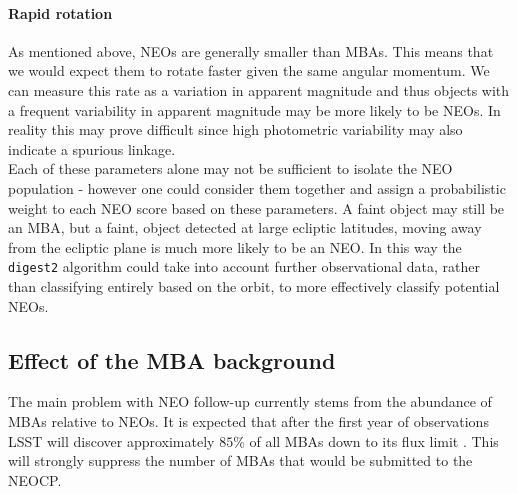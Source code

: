 \documentclass[twocolumn]{aastex631}
\newcommand{\dig}{\texttt{digest2}}
\begin{document}
\paragraph{Rapid rotation} As mentioned above, NEOs are generally smaller than MBAs. This means that we would expect them to rotate faster given the same angular momentum. We can measure this rate as a variation in apparent magnitude and thus objects with a frequent variability in apparent magnitude may be more likely to be NEOs. In reality this may prove difficult since high photometric variability may also indicate a spurious linkage.\\

Each of these parameters alone may not be sufficient to isolate the NEO population - however one could consider them together and assign a probabilistic weight to each NEO score based on these parameters. A faint object may still be an MBA, but a faint, object detected at large ecliptic latitudes, moving away from the ecliptic plane is much more likely to be an NEO. In this way the \dig{} algorithm could take into account further observational data, rather than classifying entirely based on the orbit, to more effectively classify potential NEOs.

\subsection{Effect of the MBA background}
The main problem with NEO follow-up currently stems from the abundance of MBAs relative to NEOs. It is expected that after the first year of observations LSST will discover approximately $85\%$ of all MBAs down to its flux limit \citep{Juric+2020}. This will strongly suppress the number of MBAs that would be submitted to the NEOCP.
\end{document}
